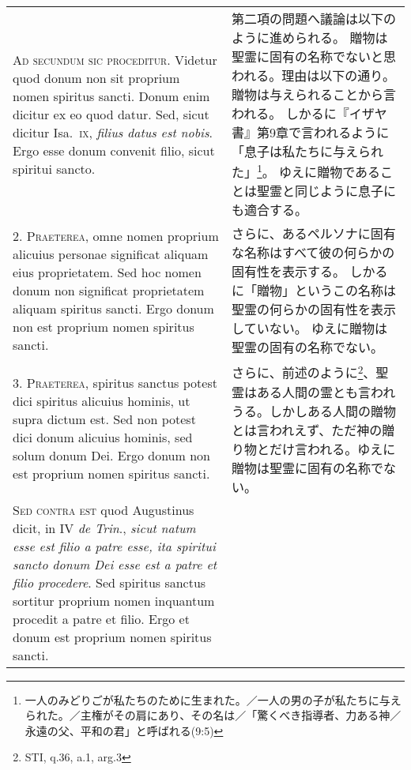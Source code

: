 \documentclass[10pt]{jsarticle} %
\begin{document}
\begin{longtable}{p{21em}p{21em}}

\textsc{Ad secundum sic proceditur.} Videtur quod donum non sit proprium nomen
spiritus sancti. Donum enim dicitur ex eo quod datur. Sed, sicut dicitur
Isa.~\textsc{ix}, \textit{filius datus est nobis}. Ergo esse donum convenit
filio, sicut spiritui sancto.


&

第二項の問題へ議論は以下のように進められる。
贈物は聖霊に固有の名称でないと思われる。理由は以下の通り。
贈物は与えられることから言われる。
しかるに『イザヤ書』第9章で言われるように「息子は私たちに与えられた」\footnote{一人のみどりごが私たちのために生まれた。／一人の男の子が私たちに与えられた。／主権がその肩にあり、その名は／「驚くべき指導者、力ある神／永遠の父、平和の君」と呼ばれる(9:5)}。
ゆえに贈物であることは聖霊と同じように息子にも適合する。

\\

2. \textsc{Praeterea}, omne nomen proprium alicuius personae significat aliquam
eius proprietatem. Sed hoc nomen donum non significat proprietatem aliquam
spiritus sancti. Ergo donum non est proprium nomen spiritus sancti.


&

さらに、あるペルソナに固有な名称はすべて彼の何らかの固有性を表示する。
しかるに「贈物」というこの名称は聖霊の何らかの固有性を表示していない。
ゆえに贈物は聖霊の固有の名称でない。

\\

3. \textsc{Praeterea}, spiritus sanctus potest dici spiritus alicuius hominis, ut supra dictum est. Sed non potest dici donum alicuius hominis, sed solum donum Dei. Ergo donum non est proprium nomen spiritus sancti.

&

さらに、前述のように\footnote{STI, q.36, a.1, arg.3}、聖霊はある人間の霊とも言われうる。しかしある人間の贈物とは言われえず、ただ神の贈り物とだけ言われる。ゆえに贈物は聖霊に固有の名称でない。
\\

\textsc{Sed contra est} quod Augustinus dicit, in IV \textit{de Trin}., \textit{sicut natum esse est filio a patre esse, ita spiritui sancto donum Dei esse est a patre et filio procedere}. Sed spiritus sanctus sortitur proprium nomen inquantum procedit a patre et filio. Ergo et donum est proprium nomen spiritus sancti.


&


\end{longtable}
\end{document}
